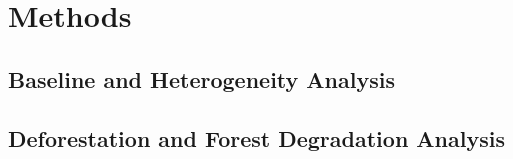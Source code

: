 \section{Methods}
\label{sec:methods}

\subsection{Baseline and Heterogeneity Analysis}






\subsection{Deforestation and Forest Degradation Analysis}
